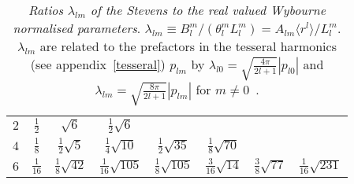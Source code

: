 \begin{table}[h]
\begin{center}
\begin{tabular}{c|ccccccc}
      \hline \hline
      $2$ & $\frac{1}{2}$  & $\sqrt{6}$             & $\frac{1}{2}\sqrt{6}$  & & & & \\
      $4$ & $\frac{1}{8}$  & $\frac{1}{2}\sqrt{5}$  & $\frac{1}{4}\sqrt{10}$   & $\frac{1}{2}\sqrt{35}$ & $\frac{1}{8}\sqrt{70}$   & & \\
      $6$ & $\frac{1}{16}$ & $\frac{1}{8}\sqrt{42}$ & $\frac{1}{16}\sqrt{105}$ & $\frac{1}{8}\sqrt{105}$ & $\frac{3}{16}\sqrt{14}$ &
            $\frac{3}{8}\sqrt{77}$ & $\frac{1}{16}\sqrt{231}$ \\
      \hline
    \end{tabular}
    \caption{\emph{Ratios $\lambda_{lm}$ of the Stevens to the real valued
 Wybourne normalised parameters}.
$\lambda_{lm} \equiv B_l^m/(\theta_l^mL_l^m)= A_{lm}\langle r^l \rangle / L_l^m$. 
$ \lambda_{lm}$ are related to the prefactors in the 
tesseral harmonics (see appendix~\ref{tesseral}) $p_{lm}$ by 
$\lambda_{l0} =\sqrt{\frac{4\pi}{2l+1}}|p_{l0}|$ and
$\lambda_{lm} =\sqrt{\frac{8\pi}{2l+1}}|p_{lm}|$ for $m \neq 0$~\cite[note that Newman on p.30, equ (2.7) defines
his real valued Wybourne 
parameters $B_m^l({\rm Newman})\equiv (-1)^m L_l^m$]{newman00-1}.} \label{tab:wytostev}
  \end{center}
\end{table}
